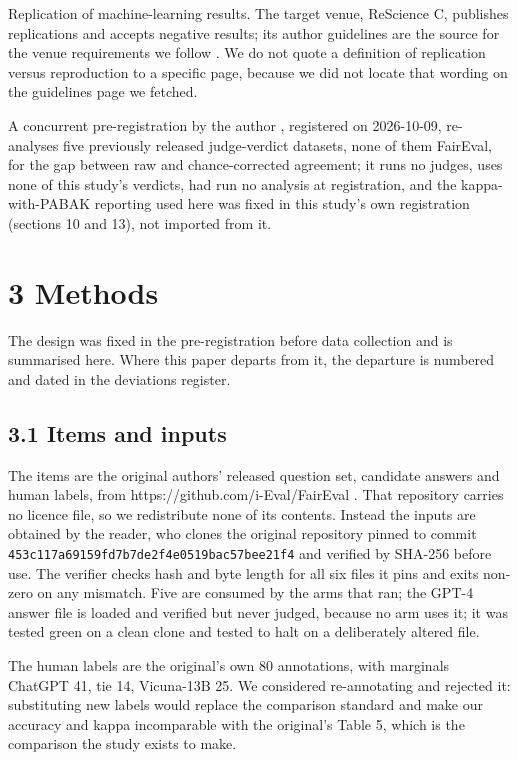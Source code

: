 Replication of machine-learning results. The target venue, ReScience C, publishes replications and accepts
negative results; its author guidelines are the source for the venue requirements we follow \autocite{rescience_guidelines}. We do
not quote a definition of replication versus reproduction to a specific page, because we did not
locate that wording on the guidelines page we fetched.

A concurrent pre-registration by the author \autocite{prereg2}, registered on 2026-10-09, re-analyses five previously released judge-verdict datasets, none of them FairEval, for the gap between raw and chance-corrected agreement; it runs no judges, uses none of this study's verdicts, had run no analysis at registration, and the kappa-with-PABAK reporting used here was fixed in this study's own registration (sections 10 and 13), not imported from it.

\section{3 Methods}\label{methods}

The design was fixed in the pre-registration before data collection and is summarised here. Where
this paper departs from it, the departure is numbered and dated in the deviations register.

\subsection{3.1 Items and inputs}\label{items-and-inputs}

The items are the original authors' released question set, candidate answers and human labels, from
https://github.com/i-Eval/FairEval \autocite{faireval}. That repository carries no licence file, so we redistribute none
of its contents. Instead the inputs are obtained by the reader, who clones the original repository pinned to
commit \texttt{453c117a69159fd7b7de2f4e0519bac57bee21f4} and verified by SHA-256 before use. The verifier
checks hash and byte length for all six files it pins and exits non-zero on any mismatch. Five are
consumed by the arms that ran; the GPT-4 answer file is loaded and verified but never judged,
because no arm uses it; it was
tested green on a clean clone and tested to halt on a deliberately altered file.

The human labels are the original's own 80 annotations, with marginals ChatGPT 41, tie 14,
Vicuna-13B 25. We considered re-annotating and rejected it: substituting new labels would replace
the comparison standard and make our accuracy and kappa incomparable with the original's Table 5,
which is the comparison the study exists to make.

